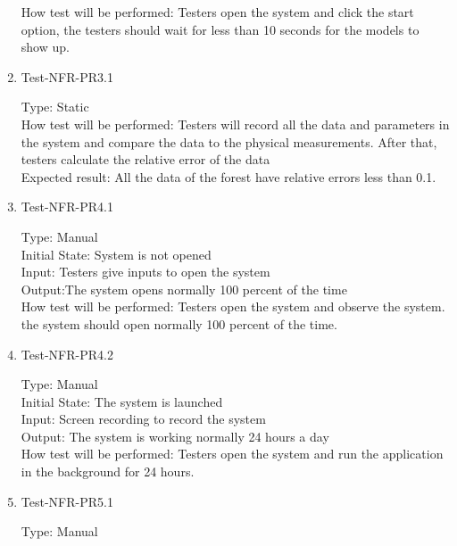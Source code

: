\documentclass[12pt, titlepage]{article}
\begin{document}
\begin{enumerate}
How test will be performed: Testers open the system and click the start option, the testers should wait for less than 10 seconds for the models to show up.

\item{Test-NFR-PR3.1\\}

Type: Static\\

How test will be performed: Testers will record all the data and parameters in the system and compare the data to the physical measurements. After that, testers calculate the relative error of the data\\

Expected result: All the data of the forest have relative errors less than 0.1.

\item{Test-NFR-PR4.1\\}

Type: Manual\\

Initial State: System is not opened\\

Input: Testers give inputs to open the system\\

Output:The system opens normally 100 percent of the time\\

How test will be performed: Testers open the system and observe the system. the system should open normally 100 percent of the time.

\item{Test-NFR-PR4.2\\}

Type: Manual\\

Initial State: The system is launched\\

Input: Screen recording to record the system\\

Output: The system is working normally 24 hours a day\\

How test will be performed: Testers open the system and run the application in the background for 24 hours.

\item{Test-NFR-PR5.1\\}

Type: Manual\\


\end{enumerate}
\end{document}
